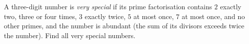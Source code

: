 A three-digit number is \emph{very special} if its prime factorisation contains $2$ exactly two, three or four times, $3$ exactly twice, $5$ at most once, $7$ at most once, and no other primes, and the number is abundant (the sum of its divisors exceeds twice the number). Find all very special numbers.
